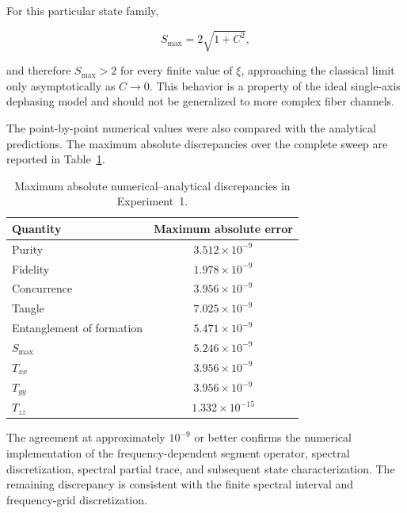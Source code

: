 For this particular state family,

\[
S_{\max}
=
2\sqrt{1+C^2},
\]

and therefore \(S_{\max}>2\) for every finite value of \(\xi\), approaching the
classical limit only asymptotically as \(C\rightarrow0\). This behavior is a
property of the ideal single-axis dephasing model and should not be generalized
to more complex fiber channels.

The point-by-point numerical values were also compared with the analytical
predictions. The maximum absolute discrepancies over the complete sweep are
reported in Table~\ref{tab:experiment_1_numerical_errors}.

\begin{table}[htbp]
    \centering
    \caption{
        Maximum absolute numerical--analytical discrepancies in
        Experiment~1.
    }
    \label{tab:experiment_1_numerical_errors}

    \begin{tabular}{lc}
        \hline
        Quantity & Maximum absolute error \\
        \hline
        Purity & \(3.512\times10^{-9}\) \\
        Fidelity & \(1.978\times10^{-9}\) \\
        Concurrence & \(3.956\times10^{-9}\) \\
        Tangle & \(7.025\times10^{-9}\) \\
        Entanglement of formation & \(5.471\times10^{-9}\) \\
        \(S_{\max}\) & \(5.246\times10^{-9}\) \\
        \(T_{xx}\) & \(3.956\times10^{-9}\) \\
        \(T_{yy}\) & \(3.956\times10^{-9}\) \\
        \(T_{zz}\) & \(1.332\times10^{-15}\) \\
        \hline
    \end{tabular}
\end{table}

The agreement at approximately \(10^{-9}\) or better confirms the numerical
implementation of the frequency-dependent segment operator, spectral
discretization, spectral partial trace, and subsequent state characterization.
The remaining discrepancy is consistent with the finite spectral interval and
frequency-grid discretization.


